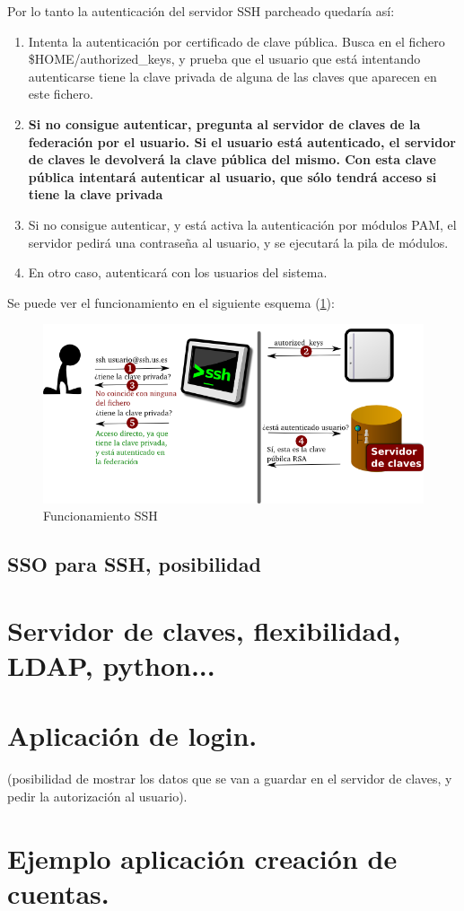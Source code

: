    Por lo tanto la autenticación del servidor SSH parcheado quedaría así:

    \begin{enumerate}

    \item Intenta la autenticación por certificado de clave pública. Busca
    en el fichero \$HOME/authorized\_keys, y prueba que el usuario que está
    intentando autenticarse tiene la clave privada de alguna de las claves
    que aparecen en este fichero.

    \item \textbf{Si no consigue autenticar, pregunta al servidor de claves
    de la federación por el usuario. Si el usuario está autenticado, el
    servidor de claves le devolverá la clave pública del mismo. Con esta
    clave pública intentará autenticar al usuario, que sólo tendrá acceso
    si tiene la clave privada}

    \item Si no consigue autenticar, y está activa la autenticación por
    módulos PAM, el servidor pedirá una contraseña al usuario, y se
    ejecutará la pila de módulos.

    \item En otro caso, autenticará con los usuarios del sistema.

    \end{enumerate}

    Se puede ver el funcionamiento en el siguiente esquema
    (\ref{fig:funcionamientossh}):

    \begin{figure}[htp!]
        \centering
            \includegraphics[width=\textwidth]{img/funcionamientossh.png}
            \caption{Funcionamiento SSH}
        \label{fig:funcionamientossh}
    \end{figure}


        \subsection{SSO para SSH, posibilidad}
    
    \section{Servidor de claves, flexibilidad, LDAP, python...}
    
    \section{Aplicación de login.}
     (posibilidad de mostrar los datos que se van a guardar en el servidor
     de claves, y pedir la autorización al usuario).

    \section{Ejemplo aplicación creación de cuentas.}
